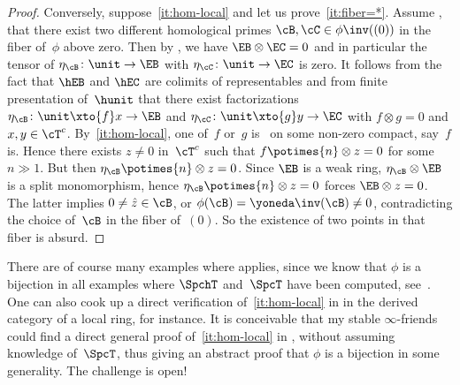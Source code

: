 \begin{appendix}
\begin{proof}
Conversely, suppose~\eqref{it:hom-local} and let us prove~\eqref{it:fiber=*}. Assume \ababs, that there exist two different homological primes $\cB,\cC\in\phi\inv((0))$ in the fiber of~$\phi$ above zero. Then by \cite[Prop.\,5.3]{Balmer20a}, we have $\EB\otimes \EC=0$ and in particular the tensor of $\eta_\cB\colon \unit\to \EB$ with $\eta_\cC\colon \unit \to \EC$ is zero. It follows from the fact that $\hEB$ and $\hEC$ are colimits of representables and from finite presentation of~$\hunit$ that there exist factorizations $\eta_\cB\colon \unit\xto{f} x\to \EB$ and $\eta_\cC\colon \unit\xto{g} y\to \EC$ with $f\otimes g=0$ and $x,y\in\cT^c$. By~\eqref{it:hom-local}, one of~$f$ or~$g$ is \tensnil\ on some non-zero compact, say~$f$ is. Hence there exists $z\neq0$ in~$\cT^c$ such that $f\potimes{n}\otimes z=0$ for some $n\gg1$. But then $\eta_\cB\potimes{n}\otimes z=0$. Since $\EB$ is a weak ring, $\eta_\cB\otimes\EB$ is a split monomorphism, hence $\eta_\cB\potimes{n}\otimes z=0$ forces $\EB\otimes z=0$. The latter implies $0\neq\hat z\in \cB$, or $\phi(\cB)=\yoneda\inv(\cB)\neq 0$, contradicting the choice of~$\cB$ in the fiber of~$(0)$. So the existence of two points in that fiber is absurd.
\end{proof}

\begin{Exa}
\label{exa:local}
There are of course many examples where  applies, since we know that $\phi$ is a bijection in all examples where $\SpchT$ and~$\SpcT$ have been computed, see~\cite[\S5]{Balmer20a}. One can also cook up a direct verification of~\eqref{it:hom-local} in  in the derived category of a local ring, for instance. It is conceivable that my stable $\infty$-friends could find a direct general proof of~\eqref{it:hom-local} in , without assuming knowledge of~$\SpcT$, thus giving an abstract proof that $\phi$ is a bijection in some generality. The challenge is open!
\end{Exa}

\end{appendix}

